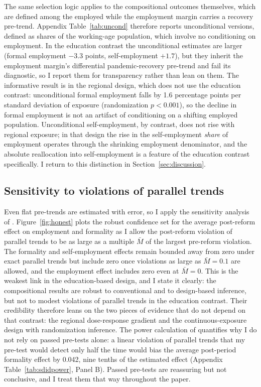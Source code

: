 The same selection logic applies to the compositional outcomes themselves, which are defined among the employed while the employment margin carries a recovery pre-trend. Appendix Table~\ref{tab:uncond} therefore reports unconditional versions, defined as shares of the working-age population, which involve no conditioning on employment. In the education contrast the unconditional estimates are larger (formal employment $-3.3$ points, self-employment $+1.7$), but they inherit the employment margin's differential pandemic-recovery pre-trend and fail its diagnostic, so I report them for transparency rather than lean on them. The informative result is in the regional design, which does not use the education contrast: unconditional formal employment falls by 1.6 percentage points per standard deviation of exposure (randomization $p<0.001$), so the decline in formal employment is not an artifact of conditioning on a shifting employed population. Unconditional self-employment, by contrast, does not rise with regional exposure; in that design the rise in the self-employment \emph{share} of employment operates through the shrinking employment denominator, and the absolute reallocation into self-employment is a feature of the education contrast specifically. I return to this distinction in Section~\ref{sec:discussion}.

\subsection{Sensitivity to violations of parallel trends}

Even flat pre-trends are estimated with error, so I apply the sensitivity analysis of \citet{rambachan_roth_2023}. Figure~\ref{fig:honest} plots the robust confidence set for the average post-reform effect on employment and formality as I allow the post-reform violation of parallel trends to be as large as a multiple $\bar{M}$ of the largest pre-reform violation. The formality and self-employment effects remain bounded away from zero under exact parallel trends but include zero once violations as large as $\bar{M}=0.1$ are allowed, and the employment effect includes zero even at $\bar{M}=0$. This is the weakest link in the education-based design, and I state it clearly: the compositional results are robust to conventional and to design-based inference, but not to modest violations of parallel trends in the education contrast. Their credibility therefore leans on the two pieces of evidence that do not depend on that contrast: the regional dose-response gradient and the continuous-exposure design with randomization inference. The power calculation of \citet{roth_2022_pretest} quantifies why I do not rely on passed pre-tests alone: a linear violation of parallel trends that my pre-test would detect only half the time would bias the average post-period formality effect by 0.042, nine tenths of the estimated effect (Appendix Table~\ref{tab:sdidpower}, Panel B). Passed pre-tests are reassuring but not conclusive, and I treat them that way throughout the paper.

